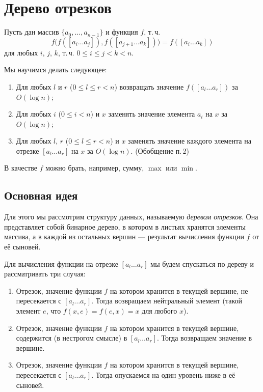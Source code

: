 \section{Дерево отрезков}

Пусть дан массив $\{a_0, \ldots, a_{n - 1}\}$ и функция $f$, т.\,ч. 
\[
    f\big(f([a_i\ldots a_j]), f([a_{j + 1}\ldots a_k])\big) = f([a_i\ldots a_k])
\]
для любых $i$, $j$, $k$, т.\,ч. $0 \leqslant i \leqslant j < k < n$.

\noindent
Мы научимся делать следующее:

\begin{enumerate}[nolistsep]
    \item Для любых $l$ и $r$ ($0 \leqslant l \leqslant r < n$) возвращать значение $f([a_l\ldots a_r])$ за $O(\log n)$;
    \item Для любых $i$ ($0 \leqslant i < n$) и $x$ заменять значение элемента $a_i$ на $x$ за~$O(\log n)$;
    \item Для любых $l$, $r$ ($0 \leqslant l \leqslant r < n$) и $x$ заменять значение каждого элемента на отрезке $[a_l\ldots a_r]$ на $x$ за $O(\log n)$. (Обобщение п.\,2)
\end{enumerate}

\begin{example}
    В качестве $f$ можно брать, например, сумму, $\max$ или $\min$.
\end{example}

\subsection{Основная идея}

Для этого мы рассмотрим структуру данных, называемую \textit{деревом отрезков}. Она представляет собой бинарное дерево, в котором в листьях хранятся элементы массива, а в каждой из остальных вершин --- результат вычисления функции $f$ от её сыновей.

Для вычисления функции на отрезке $[a_l\ldots a_r]$ мы будем спускаться по дереву и рассматривать три случая:

\begin{enumerate}[nolistsep]
    \item Отрезок, значение функции $f$ на котором хранится в текущей вершине, не пересекается с $[a_l\ldots a_r]$. Тогда возвращаем нейтральный элемент (такой элемент $e$, что $f(x, e) = f(e, x) = x$ для любого $x$).
    \item Отрезок, значение функции $f$ на котором хранится в текущей вершине, содержится (в нестрогом смысле) в $[a_l\ldots a_r]$. Тогда возвращаем значение в вершине.
    \item Отрезок, значение функции $f$ на котором хранится в текущей вершине, пересекается с $[a_l\ldots a_r]$. Тогда опускаемся на один уровень ниже в её сыновей.
\end{enumerate}

